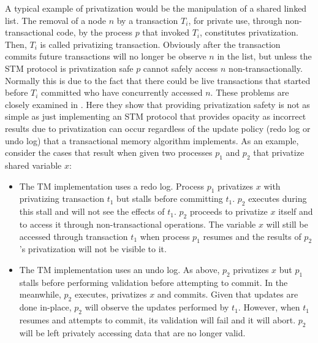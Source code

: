 A typical  example of privatization would  be the manipulation  of a shared
linked list. The  removal of a node $n$ by a  transaction $T_i$, for private
use, through  non-transactional  code,  by  the process $p$ that  invoked $T_i$,  
constitutes  privatization. Then, $T_i$  is called privatizing transaction. 
Obviously after the transaction commits future transactions will no longer
be observe $n$ in the list, but unless the STM protocol is privatization safe
$p$ cannot safely access $n$ non-transactionally.
Normally this is due to the fact that there could be live transactions
that started before $T_i$ committed who have concurrently accessed $n$.
These problems are closely examined in \cite{spear07}.
Here they show that providing privatization safety is not as
simple as just implementing an STM protocol that provides opacity as incorrect results due to
privatization can occur regardless of the update policy
(redo log or undo log)  that a  transactional memory algorithm implements. 
As  an example, consider
the cases that result when given two processes $p_1$ and   
$p_2$ that privatize shared variable $x$:
\begin{itemize}
\vspace{-0.1cm}
\item  
The TM implementation  uses a  redo log.  Process $p_1$ privatizes  $x$ with
privatizing transaction $t_1$ but stalls before committing $t_1$.  
$p_2$ executes during this stall and will not see the effects of $t_1$. 
$p_2$ proceeds to privatize $x$ itself and to access it through 
non-transactional operations. The variable $x$  will still be accessed through 
transaction $t_1$ when process $p_1$ resumes and the results of $p_2$'s 
privatization will not be visible to it. 
\vspace{-0.2cm}
\item The TM implementation uses an undo log. As above, $p_2$ privatizes 
$x$ but $p_1$ stalls before performing validation before attempting 
to commit. In the meanwhile, $p_2$ executes, privatizes $x$ and commits. 
Given that updates are done in-place, $p_2$ will observe the updates 
performed by $t_1$. However, when $t_1$ resumes and attempts to commit, 
its validation will fail and it will abort. $p_2$ will be left privately 
accessing data that are no longer valid.
\end{itemize}


